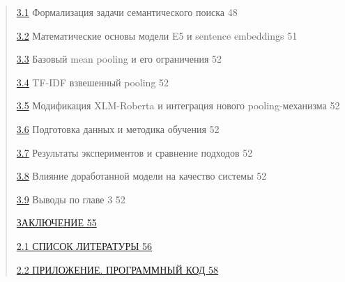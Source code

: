 \documentclass[
]{article}
\begin{document}
\begin{quote}
\protect\hyperlink{ux444ux43eux440ux43cux430ux43bux438ux437ux430ux446ux438ux44f-ux437ux430ux434ux430ux447ux438-ux441ux435ux43cux430ux43dux442ux438ux447ux435ux441ux43aux43eux433ux43e-ux43fux43eux438ux441ux43aux430}{3.1}
Формализация задачи семантического поиска 48

\protect\hyperlink{ux43cux430ux442ux435ux43cux430ux442ux438ux447ux435ux441ux43aux438ux435-ux43eux441ux43dux43eux432ux44b-ux43cux43eux434ux435ux43bux438-e5-ux438-sentence-embeddings}{3.2}
Математические основы модели E5 и sentence embeddings 51

\protect\hyperlink{ux431ux430ux437ux43eux432ux44bux439-mean-pooling-ux438-ux435ux433ux43e-ux43eux433ux440ux430ux43dux438ux447ux435ux43dux438ux44f}{3.3}
Базовый mean pooling и его ограничения 52

\protect\hyperlink{tf-idf-ux432ux437ux432ux435ux448ux435ux43dux43dux44bux439-pooling}{3.4}
TF-IDF взвешенный pooling 52

\protect\hyperlink{ux43cux43eux434ux438ux444ux438ux43aux430ux446ux438ux44f-xlm-roberta-ux438-ux438ux43dux442ux435ux433ux440ux430ux446ux438ux44f-ux43dux43eux432ux43eux433ux43e-pooling-ux43cux435ux445ux430ux43dux438ux437ux43cux430}{3.5}
Модификация XLM-Roberta и интеграция нового pooling-механизма 52

\protect\hyperlink{ux43fux43eux434ux433ux43eux442ux43eux432ux43aux430-ux434ux430ux43dux43dux44bux445-ux438-ux43cux435ux442ux43eux434ux438ux43aux430-ux43eux431ux443ux447ux435ux43dux438ux44f}{3.6}
Подготовка данных и методика обучения 52

\protect\hyperlink{ux440ux435ux437ux443ux43bux44cux442ux430ux442ux44b-ux44dux43aux441ux43fux435ux440ux438ux43cux435ux43dux442ux43eux432-ux438-ux441ux440ux430ux432ux43dux435ux43dux438ux435-ux43fux43eux434ux445ux43eux434ux43eux432}{3.7}
Результаты экспериментов и сравнение подходов 52

\protect\hyperlink{_heading=h.7v161abhcagm}{3.8} Влияние доработанной
модели на качество системы 52

\protect\hyperlink{ux432ux44bux432ux43eux434ux44b-ux43fux43e-ux433ux43bux430ux432ux435}{3.9}
Выводы по главе 3 52

\protect\hyperlink{ux437ux430ux43aux43bux44eux447ux435ux43dux438ux435}{ЗАКЛЮЧЕНИЕ
55}

\protect\hyperlink{ux441ux43fux438ux441ux43eux43a-ux43bux438ux442ux435ux440ux430ux442ux443ux440ux44b}{2.1
СПИСОК ЛИТЕРАТУРЫ 56}

\protect\hyperlink{_heading=h.qoytwf794z6d}{2.2 ПРИЛОЖЕНИЕ. ПРОГРАММНЫЙ
КОД 58}
\end{quote}
\end{document}
